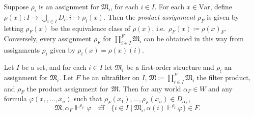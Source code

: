 \documentclass[submission,copyright,creativecommons]{eptcs}
\newcommand{\mo}{\mathfrak}
\renewcommand{\phi}{\varphi}
\renewcommand{\iff}{\quad\text{iff}\quad}
\newcommand{\Var}{\mathrm{Var}}
\newcommand{\satisfySym}{\Vdash}
\newcommand{\satisfy}[4]{#1, #2 \satisfySym^{#4} #3}
\begin{document}
  Suppose $\rho_i$ is an assignment for $\mo{M}_i$, for each $i \in I$.
  For each $x \in \Var$, define
  $\rho(x) : I \to \bigcup_{i \in I} D_i : i \mapsto \rho_i(x)$.
  Then the \emph{product assignment} $\rho_F$
  is given by letting $\rho_F(x)$ be the equivalence class of $\rho(x)$,
  i.e.~$\rho_F(x) \coloneq \rho(x)_F$.
%
  Conversely, every assignment $\rho_F$ for $\prod_{i \in I}^F\mo{M}_i$ can be obtained
  in this way from assignments $\rho_i$ given by $\rho_i(x) = \rho(x)(i)$.

\begin{theorem}
  Let $I$ be a set, and for each $i \in I$ let $\mo{M}_i$ be a
  first-order structure and $\rho_i$ an assignment for $\mo{M}_i$.
  Let $F$ be an ultrafilter on $I$,
  $\mo{M} \coloneq \prod_{i \in I}^F \mo{M}_i$ the filter product,
  and $\rho_F$ the product assignment for~$\mo{M}$.
  Then for any world $\alpha_F \in W$ and any formula $\phi(x_1, \ldots, x_n)$
  such that $\rho_F(x_1), \ldots, \rho_F(x_n) \in D_{\alpha_F}$,
  \begin{equation*}
    \satisfy{\mo{M}}{\alpha_F}{\phi}{\rho_F}
      \iff \{ i \in I \mid \satisfy{\mo{M}_i}{\alpha(i)}{\phi}{\rho_i} \} \in F.
  \end{equation*}
\end{theorem}
\end{document}
